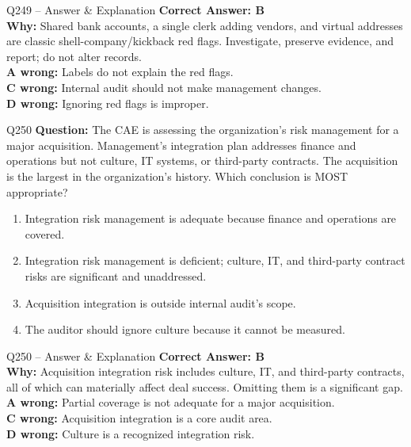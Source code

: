 \documentclass[aspectratio=169,10pt]{beamer}
\begin{document}
	\begin{frame}[t]{Q249 -- Answer \& Explanation}
		\small
		\textbf{Correct Answer: B} \\[4pt]
		\textbf{Why:} Shared bank accounts, a single clerk adding vendors, and virtual addresses are classic shell-company/kickback red flags. Investigate, preserve evidence, and report; do not alter records. \\[4pt]
		\textbf{A wrong:} Labels do not explain the red flags. \\[2pt]
		\textbf{C wrong:} Internal audit should not make management changes. \\[2pt]
		\textbf{D wrong:} Ignoring red flags is improper.
	\end{frame}
	
	\begin{frame}[t]{Q250}
		\small
		\textbf{Question:} The CAE is assessing the organization's risk management for a major acquisition. Management's integration plan addresses finance and operations but not culture, IT systems, or third-party contracts. The acquisition is the largest in the organization's history. Which conclusion is MOST appropriate?
		\begin{enumerate}[label=\Alph*.,itemsep=1pt,topsep=2pt]
			\item Integration risk management is adequate because finance and operations are covered.
			\item Integration risk management is deficient; culture, IT, and third-party contract risks are significant and unaddressed.
			\item Acquisition integration is outside internal audit's scope.
			\item The auditor should ignore culture because it cannot be measured.
		\end{enumerate}
	\end{frame}
	
	\begin{frame}[t]{Q250 -- Answer \& Explanation}
		\small
		\textbf{Correct Answer: B} \\[4pt]
		\textbf{Why:} Acquisition integration risk includes culture, IT, and third-party contracts, all of which can materially affect deal success. Omitting them is a significant gap. \\[4pt]
		\textbf{A wrong:} Partial coverage is not adequate for a major acquisition. \\[2pt]
		\textbf{C wrong:} Acquisition integration is a core audit area. \\[2pt]
		\textbf{D wrong:} Culture is a recognized integration risk.
	\end{frame}
	
\end{document}
